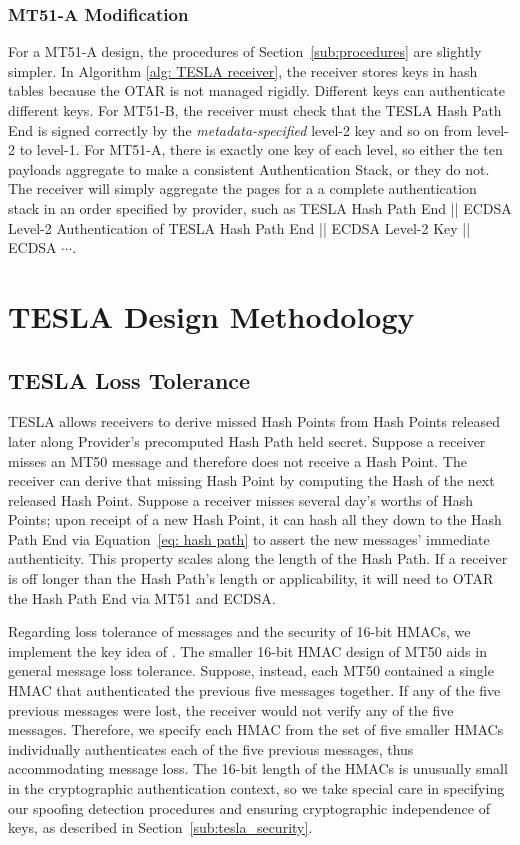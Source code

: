 \documentclass[letterpaper,times]{IONconf/IONconf}
\begin{document}
		\subsubsection{MT51-A Modification}

			For a MT51-A design, the procedures of Section~\ref{sub:procedures} are slightly simpler.
			In Algorithm \ref{alg: TESLA receiver}, the receiver stores keys in hash tables because the OTAR is not managed rigidly.
			Different keys can authenticate different keys.
			For MT51-B, the receiver must check that the TESLA Hash Path End is signed correctly by the {\em metadata-specified} level-2 key and so on from level-2 to level-1. 
			For MT51-A, there is exactly one key of each level, so either the ten payloads aggregate to make a consistent Authentication Stack, or they do not.
			The receiver will simply aggregate the pages for a a complete authentication stack in an order specified by provider, such as TESLA Hash Path End || ECDSA Level-2 Authentication of TESLA Hash Path End || ECDSA Level-2 Key || ECDSA $\cdots$.

\section{TESLA Design Methodology} \label{sec:tesla_design_methodology}

	\subsection{TESLA Loss Tolerance} \label{sub:tesla_loss_tolerance}

		TESLA allows receivers to derive missed Hash Points from Hash Points released later along Provider's precomputed Hash Path held secret.
		Suppose a receiver misses an MT50 message and therefore does not receive a Hash Point.
		The receiver can derive that missing Hash Point by computing the Hash of the next released Hash Point.
		Suppose a receiver misses several day's worths of Hash Points; upon receipt of a new Hash Point, it can hash all they down to the Hash Path End via Equation~\eqref{eq: hash path} to assert the new messages' immediate authenticity.
		This property scales along the length of the Hash Path.
		If a receiver is off longer than the Hash Path's length or applicability, it will need to OTAR the Hash Path End via MT51 and ECDSA.

		Regarding loss tolerance of messages and the security of 16-bit HMACs, we implement the key idea of \cite{Neish_Dissertation}.
		The smaller 16-bit HMAC design of MT50 aids in general message loss tolerance.
		Suppose, instead, each MT50 contained a single HMAC that authenticated the previous five messages together.
		If any of the five previous messages were lost, the receiver would not verify any of the five messages.
		Therefore, we specify each HMAC from the set of five smaller HMACs individually authenticates each of the five previous messages, thus accommodating message loss.
		The 16-bit length of the HMACs is unusually small in the cryptographic authentication context, so we take special care in specifying our spoofing detection procedures and ensuring cryptographic independence of keys, as described in Section~\ref{sub:tesla_security}.
\end{document}
